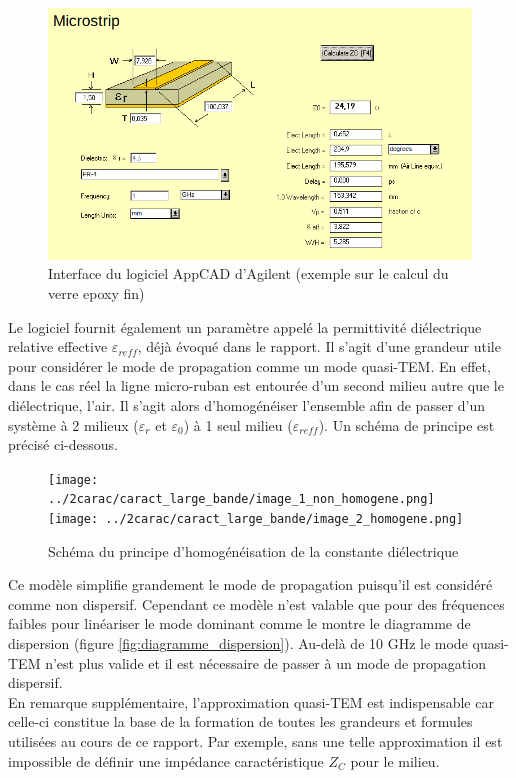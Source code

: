 \documentclass[french]{article}
\begin{document}
\begin{figure}[H]
	\centering
	\includegraphics[scale=0.4]{../2carac/caract_large_bande/interface_AppCAD.png}
	\caption{Interface du logiciel AppCAD d'Agilent (exemple sur le calcul du verre epoxy fin)}
	\label{fig:interface_appcad}
\end{figure}




Le logiciel fournit également un paramètre appelé la permittivité diélectrique relative effective $\varepsilon_{reff}$, déjà évoqué dans le rapport. Il s'agit d'une grandeur utile pour considérer le mode de propagation comme un mode quasi-TEM. En effet, dans le cas réel la ligne micro-ruban est entourée d'un second milieu autre que le diélectrique, l'air. Il s'agit alors d'homogénéiser l'ensemble afin de passer d'un système à 2 milieux ($\varepsilon_r$ et $\varepsilon_0$) à 1 seul milieu ($\varepsilon_{reff}$). Un schéma de principe est précisé ci-dessous.

\begin{figure}[H]
	\centering
	\texttt{[image: ../2carac/caract\_large\_bande/image\_1\_non\_homogene.png]}
	\texttt{[image: ../2carac/caract\_large\_bande/image\_2\_homogene.png]}
	\caption{Schéma du principe d'homogénéisation de la constante diélectrique}
	\label{fig:homogeneisation_epsilon_reff}
\end{figure}

Ce modèle simplifie grandement le mode de propagation puisqu'il est considéré comme non dispersif. Cependant ce modèle n'est valable que pour des fréquences faibles pour linéariser le mode dominant comme le montre le diagramme de dispersion (figure \ref{fig:diagramme_dispersion}). Au-delà de 10 GHz le mode quasi-TEM n'est plus valide et il est nécessaire de passer à un mode de propagation dispersif.\\
En remarque supplémentaire, l'approximation quasi-TEM est indispensable car celle-ci constitue la base de la formation de toutes les grandeurs et formules utilisées au cours de ce rapport. Par exemple, sans une telle approximation il est impossible de définir une impédance caractéristique $Z_C$ pour le milieu.
\end{document}
